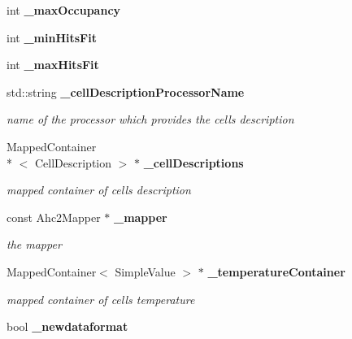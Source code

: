 \begin{DoxyCompactItemize}
\item 
int {\bfseries \-\_\-max\-Occupancy}\label{classCALICE_1_1Ahc2OccupancyCalibrator_ae0c86199c81c6cfe7e2ba8fa40de9e7b}

\item 
int {\bfseries \-\_\-min\-Hits\-Fit}\label{classCALICE_1_1Ahc2OccupancyCalibrator_a3988bb71c15879d20f492ee7d1de8a58}

\item 
int {\bfseries \-\_\-max\-Hits\-Fit}\label{classCALICE_1_1Ahc2OccupancyCalibrator_a9c9b2e0ac821a14845b208246f406283}

\item 
std\-::string {\bf \-\_\-cell\-Description\-Processor\-Name}\label{classCALICE_1_1Ahc2OccupancyCalibrator_a01731f039efcc81e00e184f96a98e790}

\begin{DoxyCompactList}\small\item\em name of the processor which provides the cells description \end{DoxyCompactList}\item 
Mapped\-Container\\*
$<$ Cell\-Description $>$ $\ast$ {\bf \-\_\-cell\-Descriptions}\label{classCALICE_1_1Ahc2OccupancyCalibrator_af83028233eb862a8973e23fe6f46be0f}

\begin{DoxyCompactList}\small\item\em mapped container of cells description \end{DoxyCompactList}\item 
const Ahc2\-Mapper $\ast$ {\bf \-\_\-mapper}\label{classCALICE_1_1Ahc2OccupancyCalibrator_ac9b4e7c9103d8d99a3b65b9fcf19aec9}

\begin{DoxyCompactList}\small\item\em the mapper \end{DoxyCompactList}\item 
Mapped\-Container$<$ Simple\-Value $>$ $\ast$ {\bf \-\_\-temperature\-Container}\label{classCALICE_1_1Ahc2OccupancyCalibrator_ab55012d14a3510fa4b89ae1fae372dd7}

\begin{DoxyCompactList}\small\item\em mapped container of cells temperature \end{DoxyCompactList}\item 
bool {\bf \-\_\-newdataformat}\label{classCALICE_1_1Ahc2OccupancyCalibrator_adaa51b1a6af59df6c4e1a762cb4ab722}


\end{DoxyCompactItemize}
